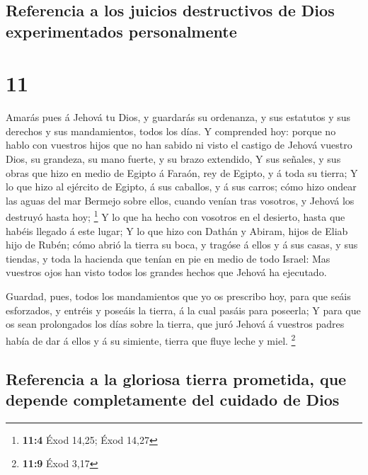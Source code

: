 \hypertarget{referencia-a-los-juicios-destructivos-de-dios-experimentados-personalmente}{%
\subsection{Referencia a los juicios destructivos de Dios experimentados
personalmente}\label{referencia-a-los-juicios-destructivos-de-dios-experimentados-personalmente}}

\hypertarget{section-10}{%
\section{11}\label{section-10}}

 Amarás pues á Jehová tu Dios, y guardarás su ordenanza, y
sus estatutos y sus derechos y sus mandamientos, todos los días.
 Y comprended hoy: porque no hablo con vuestros hijos que
no han sabido ni visto el castigo de Jehová vuestro Dios, su grandeza,
su mano fuerte, y su brazo extendido,  Y sus señales, y
sus obras que hizo en medio de Egipto á Faraón, rey de Egipto, y á toda
su tierra;  Y lo que hizo al ejército de Egipto, á sus
caballos, y á sus carros; cómo hizo ondear las aguas del mar Bermejo
sobre ellos, cuando venían tras vosotros, y Jehová los destruyó hasta
hoy; \footnote{\textbf{11:4} Éxod 14,25; Éxod 14,27}  Y lo
que ha hecho con vosotros en el desierto, hasta que habéis llegado á
este lugar;  Y lo que hizo con Dathán y Abiram, hijos de
Eliab hijo de Rubén; cómo abrió la tierra su boca, y tragóse á ellos y á
sus casas, y sus tiendas, y toda la hacienda que tenían en pie en medio
de todo Israel:  Mas vuestros ojos han visto todos los
grandes hechos que Jehová ha ejecutado.

 Guardad, pues, todos los mandamientos que yo os prescribo
hoy, para que seáis esforzados, y entréis y poseáis la tierra, á la cual
pasáis para poseerla;  Y para que os sean prolongados los
días sobre la tierra, que juró Jehová á vuestros padres había de dar á
ellos y á su simiente, tierra que fluye leche y miel. \footnote{\textbf{11:9}
  Éxod 3,17}

\hypertarget{referencia-a-la-gloriosa-tierra-prometida-que-depende-completamente-del-cuidado-de-dios}{%
\subsection{Referencia a la gloriosa tierra prometida, que depende
completamente del cuidado de
Dios}\label{referencia-a-la-gloriosa-tierra-prometida-que-depende-completamente-del-cuidado-de-dios}}

